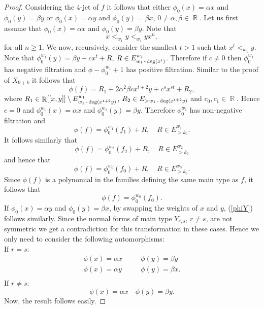 \documentclass[noend]{amsproc}
\theoremstyle{definition}
\DeclareMathOperator{\R}{\mathbb{R}}
\DeclareMathOperator{\dash}{\textnormal{-}}
\begin{document}
\begin{proof}
Considering the 4-jet of $f$ it follows that either $\phi_0(x)=\alpha x$ and $\phi_0(y)=\beta y$ or $\phi_0(x)=\alpha y$ and $\phi_0(y)=\beta x$, $0\neq \alpha,\beta\in\R$. Let us first assume that $\phi_0(x)=\alpha x$ and $\phi_0(y)=\beta y$.
Note that
\begin{equation*}
x<_{w_1}y<_{w_1}yx^n,
\end{equation*}
for all $n\ge 1$. We now, recursively, consider the smallest $t>1$ such that $x^t<_{w_1}y$. Note that $\phi_0^{w_1}(y)=\beta y+c x^t+R$, $R\in E^{w_1}_{w_1\dash\deg(x^t)}$. Therefore if $c\neq 0$ then $\phi_0^{w_1}$ has negative filtration and $\phi-\phi_0^{w_1}+1$ has positive filtration. Similar to the proof of $X_{9+k}$ it follows that
\begin{equation*}
\phi(f)=R_1+2\alpha^2\beta cx^{t+2}y+c^{s}x^{st}+R_2,
\end{equation*}
where $R_1\in\R[[x,y]]\setminus E^{w_1}_{w_1\dash\deg(x^{t+2}y)}$, $R_2\in E_{>w_1\dash\deg(x^{t+2}y)}$ and $c_0,c_1\in\R$. Hence $c=0$ and $\phi_0^{w_1}(x)=\alpha x$ and $\phi_0^{w_1}(y)=\beta y$. Therefore $\phi_0^{w_1}$ has non-negative filtration and
\begin{equation*}
\phi(f)=\phi_0^{w_1}(f_1)+R, \quad R\in E_{>k_0}^{w_1}.
\end{equation*}
It follows similarly that
\begin{equation*}
\phi(f)=\phi_0^{w_2}(f_2)+R,\quad R\in E_{> k_0}^{w_2}
\end{equation*}
and hence that
\begin{equation*}
\phi(f)=\phi_0^{w_0}(f_0)+R,\quad R\in E^{w_0}_{> k_0}.
\end{equation*}
Since $\phi(f)$ is a polynomial in the families defining the same main type as $f$, it follows that
\begin{equation}\label{phiY}
\phi(f)=\phi_0^{w_0}(f_0).
\end{equation}
If $\phi_0(x)=\alpha y$ and $\phi_0(y)=\beta x$, by swapping the weights of $x$ and $y$, (\ref{phiY}) follows similarly. Since the normal forms of main type $Y_{r,s}$, $r\neq s$, are not symmetric we get a contradiction for this transformation in these cases. Hence we only need to consider the following automorphisms:\\
If $r=s$:
\begin{eqnarray*}
\phi(x)=\alpha x&\quad&\phi(y)=\beta y\\
\phi(x)=\alpha y&\quad&\phi(y)=\beta x.\\
\end{eqnarray*}
If $r\neq s$:
\begin{equation*}
\phi(x)=\alpha x\quad\phi(y)=\beta y.
\end{equation*}
Now, the result follows easily.
\end{proof}
\end{document}
